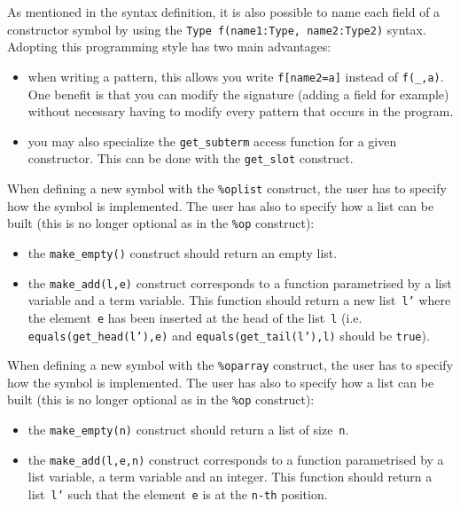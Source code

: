 \documentclass[a4paper]{article}
\begin{document}
\noindent
As mentioned in the syntax definition, it is also possible to name
each field of a constructor symbol by using the
\texttt{Type f(name1:Type, name2:Type2)} syntax.  
Adopting this programming style has two main advantages:
\begin{itemize}
\item when writing a pattern, this allows you write \texttt{f[name2=a]}
  instead of \texttt{f(\_,a)}. One benefit is that you can modify the
  signature (adding a field for example) without necessary having to
  modify every pattern that occurs in the program.

\item you may also specialize the \texttt{get\_subterm} access
function for a given constructor. This can be done with the
\texttt{get\_slot} construct.
\end{itemize}

\smallskip\noindent
When defining a new symbol with the \texttt{\%oplist} construct,
the user has to specify how the symbol is implemented. 
The user has also to specify how a list can be built (this is no
longer optional as in the \texttt{\%op} construct):
\begin{itemize}
\item the \texttt{make\_empty()} construct should return an empty
  list.

\item the \texttt{make\_add(l,e)} construct corresponds to a function
  parametrised by a list variable and a term variable. This function
  should return a new list~\texttt{l'} where the element~\texttt{e}
  has been inserted at the head of the list~\texttt{l}
  (i.e. \texttt{equals(get\_head(l'),e)} and
  \texttt{equals(get\_tail(l'),l)} should be \texttt{true}).
\end{itemize}

\noindent
When defining a new symbol with the \texttt{\%oparray} construct,
the user has to specify how the symbol is implemented. 
The user has also to specify how a list can be built (this is no 
longer optional as in the \texttt{\%op} construct):
\begin{itemize}
\item the \texttt{make\_empty(n)} construct should return a list of
  size~\texttt{n}.  

\item the \texttt{make\_add(l,e,n)} construct corresponds to a
  function parametrised by a list variable, a term variable and an
  integer. This function should return a list~\texttt{l'} such that
  the element~\texttt{e} is at the \texttt{n-th} position.
\end{itemize}
\end{document}
